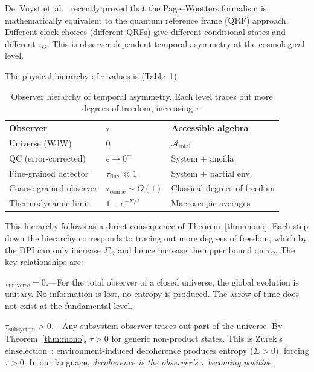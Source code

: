 \documentclass[prl,twocolumn,superscriptaddress,longbibliography,floatfix]{revtex4-2}
\newcommand{\tauasym}{\tau}
\newcommand{\algO}{\mathcal{A}}
\begin{document}
De~Vuyst et~al.~\cite{DeVuyst2025} recently proved that the
Page--Wootters formalism is mathematically equivalent to the
quantum reference frame (QRF) approach.  Different clock
choices (different QRFs) give different conditional states and
different $\tauasym_O$.  This is observer-dependent temporal
asymmetry at the cosmological level.

The physical hierarchy of $\tauasym$ values is
(Table~\ref{tab:hierarchy}):

\begin{table}[t]
\caption{\label{tab:hierarchy}Observer hierarchy of temporal
asymmetry.  Each level traces out more degrees of freedom,
increasing $\tauasym$.}
\begin{ruledtabular}
\begin{tabular}{lll}
\textbf{Observer} & $\tauasym$ & \textbf{Accessible algebra} \\
\colrule
Universe (WdW) & $0$ & $\algO_{\mathrm{total}}$  \\
QC (error-corrected) & $\epsilon \to 0^+$ &
  System $+$ ancilla \\
Fine-grained detector & $\tauasym_{\mathrm{fine}} \ll 1$ &
  System $+$ partial env. \\
Coarse-grained observer & $\tauasym_{\mathrm{coarse}} \sim O(1)$ &
  Classical degrees of freedom \\
Thermodynamic limit & $1 - e^{-\Sigma/2}$ &
  Macroscopic averages \\
\end{tabular}
\end{ruledtabular}
\end{table}

This hierarchy follows as a direct consequence
of Theorem~\ref{thm:mono}.  Each step down the hierarchy
corresponds to tracing out more degrees of freedom, which by
the DPI can only increase $\Sigma_O$ and hence increase the
upper bound on $\tauasym_O$.  The key relationships are:

\emph{$\tauasym_{\mathrm{universe}} = 0$.}---For the total
observer of a closed universe, the global evolution is unitary.
No information is lost, no entropy is produced.  The arrow
of time does not exist at the fundamental level.

\emph{$\tauasym_{\mathrm{subsystem}} > 0$.}---Any subsystem
observer traces out part of the universe.  By
Theorem~\ref{thm:mono}, $\tauasym > 0$ for generic
non-product states.  This is Zurek's
einselection~\cite{Zurek2003}: environment-induced decoherence
produces entropy ($\Sigma > 0$), forcing $\tauasym > 0$.  In
our language, \emph{decoherence is the observer's $\tauasym$
becoming positive}.
\end{document}

